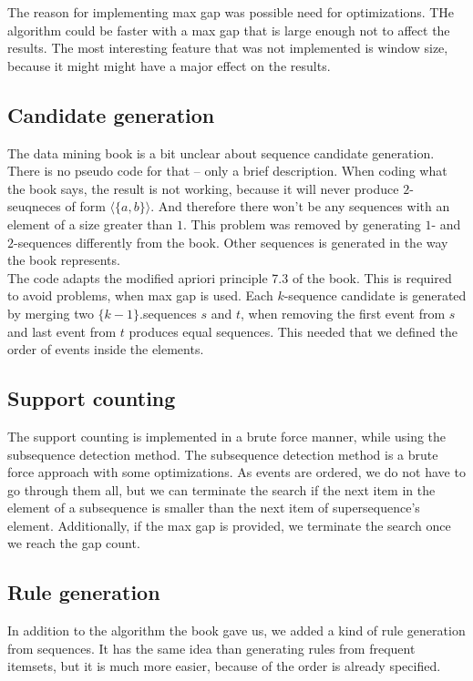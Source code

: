 The reason for implementing max gap was possible need for optimizations. THe algorithm could be faster 
with a max gap that is large enough not to affect the results. The most interesting feature 
that was not implemented is window size, because it might might have a major effect on 
the results.

\subsection{Candidate generation}
The data mining book is a bit unclear about sequence candidate generation. There is no pseudo code for that -- only a brief description. When coding what the book says, the result is not working, because it will never produce $2$-seuqneces of form $\langle\{a,b\}\rangle$. And therefore there won't be any sequences with an element of a size greater than $1$. This problem was removed by generating $1$- and $2$-sequences differently from the book. Other sequences is generated in the way the book represents.\\ 

The code adapts the modified apriori principle 7.3 of the book. This is required to avoid problems, when max gap is used. Each $k$-sequence candidate is generated by merging two $\{k-1\}$.sequences $s$ and $t$, when removing the first event from $s$ and last event from $t$ produces equal sequences. This needed that we defined the order of events inside the elements.

\subsection{Support counting}
The support counting is implemented in a brute force manner, while using the subsequence detection method. The subsequence detection method is a brute force approach with some optimizations. As events are ordered, we do not have to go through them all, but we can terminate the search if the next item in the element of a subsequence is smaller than the next item of supersequence’s element. Additionally, if the max gap is provided, we terminate the search once we reach the gap count.

\subsection{Rule generation}
In addition to the algorithm the book gave us, we added a kind of rule generation from sequences. It has the same idea than generating rules from frequent itemsets, but it is much more easier, because of the order is already specified.
